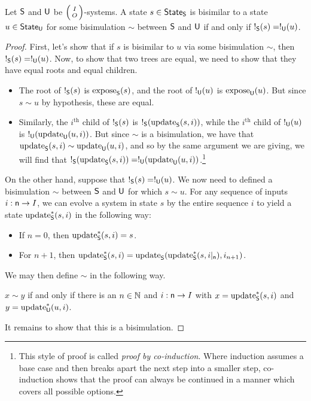 \documentclass[DynamicalBook]{subfiles}
\begin{document}
\begin{theorem}
  Let $\mathsf{S}$ and $\mathsf{U}$ be $\lens{I}{O}$-systems. A state $s \in
  \mathsf{State}_{\mathsf{S}}$ is bisimilar to a state $u \in \mathsf{State}_{\mathsf{U}}$ for some bisimulation
  $\sim$ between $\mathsf{S}$ and $\mathsf{U}$ if and only if $!_{\mathsf{S}}(s) = !_{\mathsf{U}}(u)$.
\end{theorem}
\begin{proof}
 First, let's show that if $s$ is bisimilar to $u$ via some bisimulation $\sim$,
 then $!_{\mathsf{S}}(s) = !_{\mathsf{U}}(u)$. Now, to show that two trees are equal,
 we need to show that they have equal roots and equal children.
 \begin{itemize}
   \item The root of $!_{\mathsf{S}}(s)$ is $\mathrm{expose}_{\mathsf{S}}(s)$, and the root of
     $!_{\mathsf{U}}(u)$ is $\mathrm{expose}_{\mathsf{U}}(u)$. But since $s \sim u$ by hypothesis,
     these are equal.
   \item Similarly, the $i^{\text{th}}$ child of $!_{\mathsf{S}}(s)$ is
    $!_{\mathsf{S}}(\mathrm{update}_{\mathsf{S}}(s, i))$, while the $i^{\text{th}}$ child of
    $!_{\mathsf{U}}(u)$ is $!_{\mathsf{U}}( \mathrm{update}_{\mathsf{U}}(u, i) )$. But since $\sim$ is a
    bisimulation, we have that $\mathrm{update}_{\mathsf{S}}(s, i) \sim \mathrm{update}_{\mathsf{U}}(u, i)$, and so
    by the same argument we are giving, we will find that
    $!_{\mathsf{S}}(\mathrm{update}_{\mathsf{S}}(s, i)) = !_{\mathsf{U}}(\mathrm{update}_{\mathsf{U}}(u,
    i))$.\footnote{This style of proof is called \emph{proof by co-induction}.
      Where induction assumes a base case and then breaks apart the next step
      into a smaller step, co-induction shows that the proof can always be
      continued in a manner which covers all possible options.}
 \end{itemize}

On the other hand, suppose that $!_{\mathsf{S}}(s) = !_{\mathsf{U}}(u)$. We now need
to defined a bisimulation $\sim$ between $\mathsf{S}$ and $\mathsf{U}$ for which $s
\sim u$. For any sequence of inputs $i : \mathsf{n} \to I$, we can evolve a system
in state $s$ by the entire sequence $i$ to yield a state $\mathrm{update}_{\mathsf{S}}^{\ast}(s,
i)$ in the following way:
\begin{itemize}
  \item If $n = 0$, then $\mathrm{update}_{\mathsf{S}}^{\ast}(s, i) = s$.
  \item For $n + 1$, then $\mathrm{update}_{\mathsf{S}}^{\ast}(s, i) =
    \mathrm{update}_{\mathsf{S}}(\mathrm{update}_{\mathsf{S}}^{\ast}(s, i|_{\mathsf{n}}), i_{n + 1})$.
\end{itemize}
We may then define $\sim$ in the following way.

\begin{center}
$x \sim y$ if and only if there is an $n \in \mathbb{N}$ and $i : \mathsf{n} \to I$ with
$x = \mathrm{update}_{\mathsf{S}}^{\ast}(s, i)$ and $y = \mathrm{update}_{\mathsf{U}}^{\ast}(u, i)$.
\end{center}
It remains to show that this is a bisimulation.


\end{proof}
\end{document}
